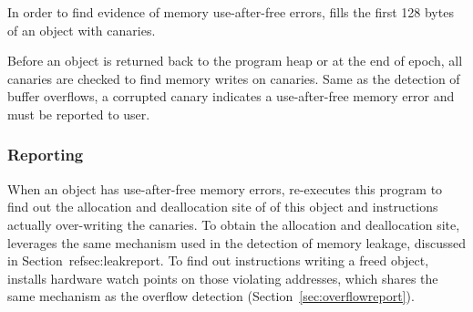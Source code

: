 In order to find evidence of memory use-after-free errors, 
\doubletake{} fills the first 128 bytes of an object with canaries. 

Before an object is returned back to the program heap or at the end of epoch, all canaries are checked to find memory writes on canaries. Same as the detection of buffer overflows, a corrupted canary indicates a use-after-free memory error and must be reported to user. 

\subsubsection{Reporting}
When an object has use-after-free memory errors, 
\doubletake{} re-executes this program to find out the allocation and deallocation site of of this object and instructions actually over-writing the canaries.
To obtain the allocation and deallocation site, 
\doubletake{} leverages the same mechanism used in
the detection of memory leakage, discussed in Section~ref{sec:leakreport}.
To find out instructions writing a freed object, 
\doubletake{} installs hardware watch points on those violating addresses, which shares the same mechanism as the overflow detection (Section~\ref{sec:overflowreport}).
